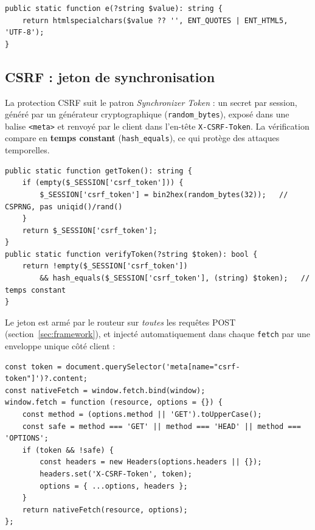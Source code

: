 \begin{lstlisting}[style=php, caption={Échappement côté serveur — \file{src/Utils.php}}]
public static function e(?string $value): string {
    return htmlspecialchars($value ?? '', ENT_QUOTES | ENT_HTML5, 'UTF-8');
}
\end{lstlisting}

\subsection{CSRF : jeton de synchronisation}

La protection CSRF suit le patron \emph{Synchronizer Token} : un secret par session, généré par
un générateur cryptographique (\texttt{random\_bytes}), exposé dans une balise \texttt{<meta>} et
renvoyé par le client dans l'en-tête \texttt{X-CSRF-Token}. La vérification compare en
\textbf{temps constant} (\texttt{hash\_equals}), ce qui protège des attaques temporelles.

\begin{lstlisting}[style=php, caption={Génération et vérification du jeton CSRF — \file{src/CsrfHelper.php}}]
public static function getToken(): string {
    if (empty($_SESSION['csrf_token'])) {
        $_SESSION['csrf_token'] = bin2hex(random_bytes(32));   // CSPRNG, pas uniqid()/rand()
    }
    return $_SESSION['csrf_token'];
}
public static function verifyToken(?string $token): bool {
    return !empty($_SESSION['csrf_token'])
        && hash_equals($_SESSION['csrf_token'], (string) $token);   // temps constant
}
\end{lstlisting}

Le jeton est armé par le routeur sur \emph{toutes} les requêtes POST (section~\ref{sec:framework}),
et injecté automatiquement dans chaque \texttt{fetch} par une enveloppe unique côté client :

\begin{lstlisting}[style=js, caption={Injection automatique du jeton dans tout \texttt{fetch} — \file{public/scripts/index.js}}]
const token = document.querySelector('meta[name="csrf-token"]')?.content;
const nativeFetch = window.fetch.bind(window);
window.fetch = function (resource, options = {}) {
    const method = (options.method || 'GET').toUpperCase();
    const safe = method === 'GET' || method === 'HEAD' || method === 'OPTIONS';
    if (token && !safe) {
        const headers = new Headers(options.headers || {});
        headers.set('X-CSRF-Token', token);
        options = { ...options, headers };
    }
    return nativeFetch(resource, options);
};
\end{lstlisting}

